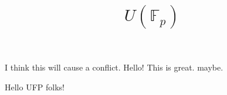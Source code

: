 \documentclass{amsart}
\begin{document}
I think this will cause a conflict. 
 Hello! This is great. maybe. 


    \title{$U(\mathbb{F}_p)$}



    \maketitle

 Hello UFP folks!
\end{document}

